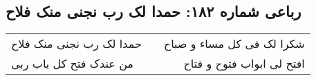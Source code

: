 \begin{center}
\section*{رباعی شماره ۱۸۲: حمدا لک رب نجنی منک فلاح}
\label{sec:sh182}
\begin{longtable}{l p{0.5cm} r}
حمدا لک رب نجنی منک فلاح
&&
شکرا لک فی کل مساء و صباح
\\
من عندک فتح کل باب ربی
&&
افتح لی ابواب فتوح و فتاح
\\
\end{longtable}
\end{center}
